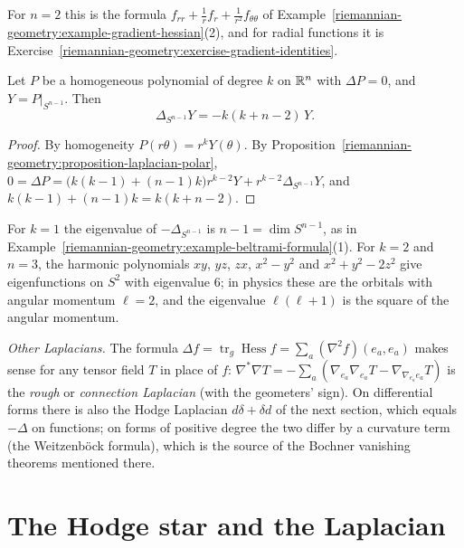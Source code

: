 For $n = 2$ this is the formula $f_{rr} + \frac1rf_r + \frac1{r^2}f_{\theta\theta}$ of Example~\ref{riemannian-geometry:example-gradient-hessian}(2), and for radial functions it is
Exercise~\ref{riemannian-geometry:exercise-gradient-identities}.

\begin{corollary}\label{riemannian-geometry:corollary-spherical-harmonics}
Let $P$ be a homogeneous polynomial of degree $k$ on $\mathbb{R}^n$ with $\Delta P = 0$, and $Y = P|_{S^{n-1}}$. Then
\[
\Delta_{S^{n-1}}Y = -k(k + n - 2)\,Y .
\]
\end{corollary}

\begin{proof}
By homogeneity $P(r\theta) = r^kY(\theta)$. By Proposition~\ref{riemannian-geometry:proposition-laplacian-polar},
$0 = \Delta P = \bigl(k(k - 1) + (n - 1)k\bigr)r^{k-2}Y + r^{k-2}\Delta_{S^{n-1}}Y$, and $k(k - 1) + (n - 1)k = k(k + n - 2)$.
\end{proof}

For $k = 1$ the eigenvalue of $-\Delta_{S^{n-1}}$ is $n - 1 = \dim S^{n-1}$, as in Example~\ref{riemannian-geometry:example-beltrami-formula}(1). For $k = 2$ and $n = 3$, the harmonic
polynomials $xy$, $yz$, $zx$, $x^2 - y^2$ and $x^2 + y^2 - 2z^2$ give eigenfunctions on $S^2$ with eigenvalue $6$; in physics these are the orbitals with angular momentum $\ell = 2$, and
the eigenvalue $\ell(\ell + 1)$ is the square of the angular momentum.

\begin{remark}\label{riemannian-geometry:remark-laplacians}
\emph{Other Laplacians.} The formula $\Delta f = \operatorname{tr}_g\operatorname{Hess}f = \sum_a(\nabla^2f)(e_a, e_a)$ makes sense for any tensor field $T$ in place of $f$:
$\nabla^*\nabla T = -\sum_a(\nabla_{e_a}\nabla_{e_a}T - \nabla_{\nabla_{e_a}e_a}T)$ is the \emph{rough} or \emph{connection Laplacian} (with the geometers' sign). On differential forms there is
also the Hodge Laplacian $d\delta + \delta d$ of the next section, which equals $-\Delta$ on functions; on forms of positive degree the two differ by a curvature term (the
Weitzenb\"ock formula), which is the source of the Bochner vanishing theorems mentioned there.
\end{remark}

\section{The Hodge star and the Laplacian}\label{riemannian-geometry:section-hodge-star}

